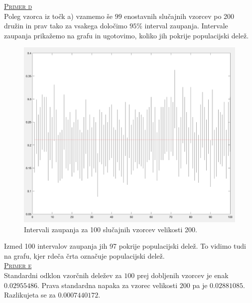 \documentclass[a4paper,12pt]{article}
\begin{document}
\noindent
\textsc{\underline{Primer d}}
\\
Poleg vzorca iz točk a) vzamemo še $99$ enostavnih slučajnih vzorcev po 200 družin in prav tako za vsakega določimo $95 \%$ interval zaupanja. Intervale zaupanja prikažemo na grafu in ugotovimo, koliko jih pokrije populacijski delež.
\begin{figure}[ht!]
    \centering
    \includegraphics[width=120mm]{CI_200.png}
    \caption{Intervali zaupanja za 100 slučajnih vzorcev velikosti 200.}
\end{figure}

\noindent
Izmed 100 intervalov zaupanja jih 97 pokrije populacijski delež. To vidimo tudi na grafu, kjer rdeča črta označuje populacijski delež.
\\

\noindent
\textsc{\underline{Primer e}}
\\
Standardni odklon vzorčnih deležev za $100$ prej dobljenih vzorcev je enak $0.02955486$. Prava standardna napaka za vzorec velikosti $200$ pa je $0.02881085$.
Razlikujeta se za $0.0007440172$.
\\

\end{document}
